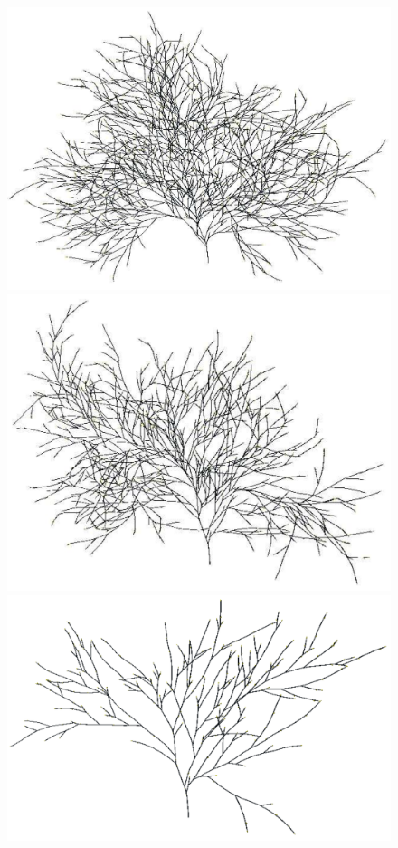 \begin{figure}
\includegraphics[scale=0.15]{auvaursi-sandpit-15-35d-30cm}
\includegraphics[scale=0.15]{auvaursi-sandpit-15-45d-30cm}
\includegraphics[scale=0.15]{auvaursi-sandpit-15-65d-30cm}    

\end{figure}
